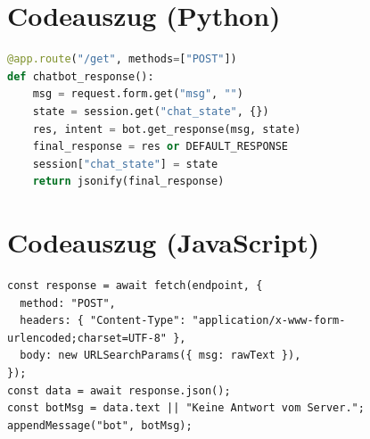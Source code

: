 \documentclass[a4paper,11pt]{article}
\begin{document}
\section{Codeauszug (Python)}
\begin{lstlisting}[style=shared,language=Python]
@app.route("/get", methods=["POST"])
def chatbot_response():
    msg = request.form.get("msg", "")
    state = session.get("chat_state", {})
    res, intent = bot.get_response(msg, state)
    final_response = res or DEFAULT_RESPONSE
    session["chat_state"] = state
    return jsonify(final_response)
\end{lstlisting}

\section{Codeauszug (JavaScript)}
\begin{lstlisting}[style=shared]
const response = await fetch(endpoint, {
  method: "POST",
  headers: { "Content-Type": "application/x-www-form-urlencoded;charset=UTF-8" },
  body: new URLSearchParams({ msg: rawText }),
});
const data = await response.json();
const botMsg = data.text || "Keine Antwort vom Server.";
appendMessage("bot", botMsg);
\end{lstlisting}
\end{document}
